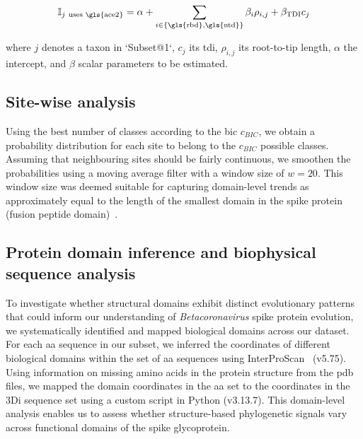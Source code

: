 
\begin{equation}
    \mathbb{I}_{j~\text{uses \gls{ace2}}} = \alpha + \sum_{i \in \{\text{\gls{rbd}}, \text{\gls{ntd}}\}} \beta_i \rho_{i,j} + \beta_{\text{TDI}} c_j
\end{equation}

where $j$ denotes a taxon in `Subset@1`, $c_j$ its \gls{tdi}, $\rho_{i,j}$ its root-to-tip length, $\alpha$ the intercept, and $\beta$ scalar parameters to be estimated.

\subsection{Site-wise analysis}
\label{bcov3d:sitewise}
Using the best number of classes according to the \gls{bic} $c_{BIC}$, we obtain a probability distribution for each site to belong to the $c_{BIC}$ possible classes. Assuming that neighbouring sites should be fairly continuous, we smoothen the probabilities using a moving average filter with a window size of $w = 20$. This window size was deemed suitable for capturing domain-level trends as approximately equal to the length of the smallest domain in the spike protein (fusion peptide domain)~\cite{huang2020a}.

\subsection{Protein domain inference and biophysical sequence analysis}

To investigate whether structural domains exhibit distinct evolutionary patterns that could inform our understanding of \textit{Betacoronavirus} spike protein evolution, we systematically identified and mapped biological domains across our dataset. For each \gls{aa} sequence in our subset, we inferred the coordinates of different biological domains within the set of \gls{aa} sequences using InterProScan~\cite{jones2014} (v5.75). Using information on missing amino acids in the protein structure from the \gls{pdb} files, we mapped the domain coordinates in the \gls{aa} set to the coordinates in the 3Di sequence set using a custom script in Python (v3.13.7). This domain-level analysis enables us to assess whether structure-based phylogenetic signals vary across functional domains of the spike glycoprotein.

